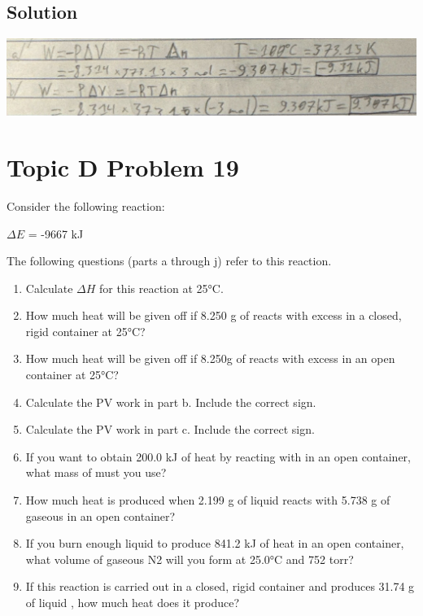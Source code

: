 \documentclass[10pt]{article}
\begin{document}
        
        \subsection{Solution}
            \begin{center}
                \includegraphics[width=\textwidth]{Answers Images/Problem 18.jpg}
            \end{center}

    \pagebreak
    \section{Topic D Problem 19}
        Consider the following reaction:
        \begin{center}
             $\Delta E$ = -9667 kJ
        \end{center}
        The following questions (parts a through j) refer to this reaction.
        \begin{enumerate}[label=\alph*)]
            \item   Calculate $\Delta H$ for this reaction at 25\unit{\celsius}.
            \item   How much heat will be given off if 8.250 g of  reacts with excess  in a closed, rigid container at 25\unit{\celsius}?
            \item   How much heat will be given off if 8.250g of  reacts with excess  in an open container at 25\unit{\celsius}?
            \item   Calculate the PV work in part b. Include the correct sign.
            \item   Calculate the PV work in part c. Include the correct sign.
            \item   If you want to obtain 200.0 kJ of heat by reacting  with  in an open container, what mass of  must you use?
            \item   How much heat is produced when 2.199 g of liquid  reacts with 5.738 g of gaseous  in an open container?
            \item   If you burn enough liquid  to produce 841.2 kJ of heat in an open container, what volume of gaseous N2 will you form at 25.0\unit{\celsius} and 752 torr?
            \item   If this reaction is carried out in a closed, rigid container and produces 31.74 g of liquid , how much heat does it produce?
        \end{enumerate}
        
\end{document}
